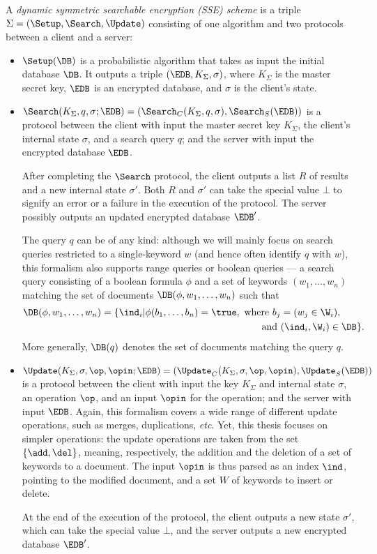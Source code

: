 A \emph{dynamic symmetric searchable encryption (SSE) scheme} is a triple $\Sigma = (\Setup, \allowbreak \Search,  \allowbreak  \Update)$ consisting of one algorithm and two protocols between a client and a server:
\begin{itemize}
	\item $\Setup(\DB)$ is a probabilistic algorithm that takes as input the initial database $\DB$. 
	It outputs a triple $(\EDB, K_\Sigma, \sigma)$, where $K_\Sigma$ is the master secret key, $\EDB$ is an encrypted database, and $\sigma$ is the client's state.
	
	\item $\Search(K_\Sigma,q,\sigma;\EDB) = (\Search_C(K_\Sigma,q,\sigma),\Search_S(\EDB))$ is a protocol between the client with input the master secret key $K_\Sigma$, the client's internal state $\sigma$, and a search query $q$; and the server with input the encrypted database $\EDB$.
	
	After completing the $\Search$ protocol, the client outputs a list $R$ of results and a new internal state $\sigma'$.
	Both $R$ and $\sigma'$ can take the special value $\bot$ to signify an error or a failure in the execution of the protocol.
	The server possibly outputs an updated encrypted database $\EDB'$.
	
	
	The query $q$ can be of any kind: although we will mainly focus on search queries restricted to a single-keyword $w$ (and hence often identify $q$ with $w$), this formalism also supports range queries or boolean queries --- a search query consisting of a boolean formula $\phi$ and a set of keywords $(w_1,\dots,w_n)$ matching the set of documents $\DB(\phi, w_1,\dots,w_n)$ such that
	\begin{align*}
		\DB(\phi, w_1,\dots,w_n) = \{\ind_i | \phi(b_1, \dots, b_n) = \true, \text{ where } b_j &= (w_j \in \W_i), \\
		 \text{ and } &(\ind_i, \W_i) \in \DB \}.
	\end{align*}
	More generally, $\DB(q)$ denotes the set of documents matching the query $q$.
				
	\item $\Update(K_\Sigma,\sigma, \op,\opin;\EDB)=(\Update_C(K_\Sigma,\sigma, \op,\opin), \allowbreak \Update_S(\EDB))$ is a protocol between the client with input the key $K_\Sigma$ and internal state $\sigma$, an operation $\op$, and an input $\opin$ for the operation; and the server with input $\EDB$.
	Again, this formalism covers a wide range of different update operations, such as merges, duplications, \emph{etc}.
	Yet, this thesis focuses on simpler operations: the update operations are taken from the set $\{\add, \allowbreak\del\}$, meaning, respectively, the addition and the deletion of a set of keywords to a document.
	The input $\opin$ is thus parsed as an index $\ind$, pointing to the modified document, and a set $W$ of keywords to insert or delete.


	At the end of the execution of the protocol, the client outputs a new state $\sigma'$, which can take the special value $\bot$, and the server outputs a new encrypted database $\EDB'$.
\end{itemize}

